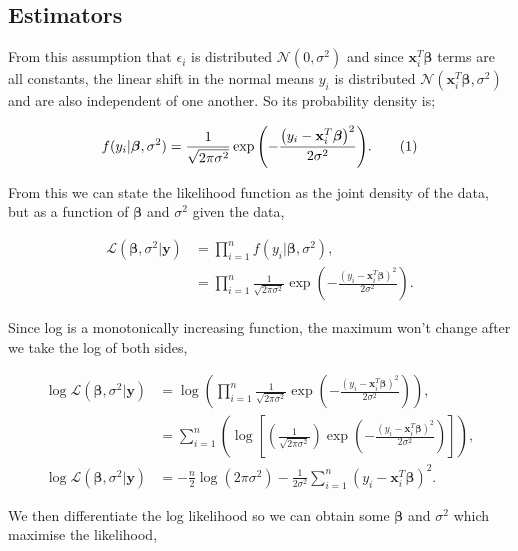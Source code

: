 \documentclass[honours,12pt]{unswthesis}
\newcommand{\e}[1]{\exp{\left( #1 \right)}}
\newcommand\numberthis{\addtocounter{equation}{1}\tag{\theequation}}
\numberwithin{equation}{section}
\begin{document}
\subsection{Estimators}
From this assumption that $\epsilon_{i}$ is distributed $\mathcal{N} (0, \sigma^{2})$ and since $ \mathbf{x}_{i}^{T}\bm{\beta}$ terms are all constants, the linear shift in the normal means $y_{i}$ is distributed $\mathcal{N} ( \mathbf{x}_{i}^{T} \bm{\beta}, \sigma^{2})$ and are also independent of one another. So its probability density is;

\begin{align*}
	f(y_{i}|\bm{\beta},\sigma^{2}) = \frac{1}{\sqrt{2 \pi \sigma^{2}}}\exp{\left(-\frac{\left( y_{i} - \mathbf{x}_{i}^{T}\bm{\beta} \right)^{2}}{2 \sigma^{2}}\right)}. \numberthis
\end{align*}

\noindent From this we can state the likelihood function as the joint density of the data, but as a function of $\bm{\beta}$ and $\sigma^{2}$ given the data,

\begin{align*}
	\mathcal{L}(\bm{\beta},\sigma^{2} | \mathbf{y}) &= \prod_{i=1}^{n} f(y_{i}|\bm{\beta},\sigma^{2}),\\
	&= \prod_{i=1}^{n}\frac{1}{\sqrt{2\pi \sigma^{2}}} \e{-\frac{\left( y_{i} - \mathbf{x}_{i}^{T}\bm{\beta} \right)^{2}}{2 \sigma^{2}}}.
\end{align*}

\noindent Since log is a monotonically increasing function, the maximum won't change after we take the log of both sides,

\begin{align*}
	\log\mathcal{L}(\bm{\beta},\sigma^{2} | \mathbf{y}) &= \log \left(\prod_{i=1}^{n} \frac{1}{\sqrt{2 \pi \sigma^{2}}}\e{-\frac{\left( y_{i} - \mathbf{x}_{i}^{T}\bm{\beta} \right)^{2}}{2 \sigma^{2}}}\right), \\
	&= \sum_{i=1}^{n} \left( \log \left[ \left( \frac{1}{\sqrt{2 \pi \sigma^{2}}} \right) \exp{ \left(-\frac{\left( y_{i} - \mathbf{x}_{i}^{T}\bm{\beta} \right)^{2}}{2 \sigma^{2}} \right) } \right] \right), \\
	\log\mathcal{L}(\bm{\beta},\sigma^{2} | \mathbf{y}) &= -\frac{n}{2}\log\left(2 \pi \sigma^{2}\right) - \frac{1}{2\sigma^{2}}\sum_{i=1}^{n}\left( y_{i} - \mathbf{x}_{i}^{T}\bm{\beta} \right)^{2}.
\end{align*}

\noindent We then differentiate the log likelihood so we can obtain some $\bm{\beta}$ and $\sigma^{2}$ which maximise the likelihood,
\end{document}
